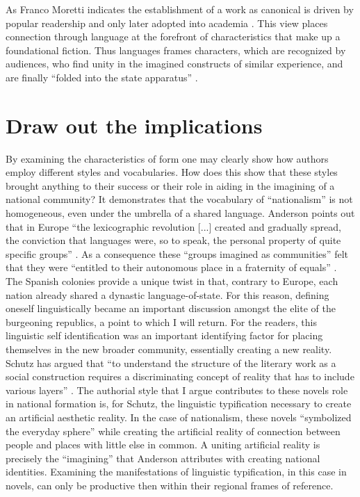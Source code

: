 \documentclass[12pt]{report}\usepackage[]{graphicx}\usepackage[]{color}
\begin{document}
\begin{spacing}{1.9}
As Franco Moretti indicates the establishment of a work as canonical is driven by popular readership and only later adopted into academia \autocite[]{Moretti2013}.
This view places connection through language at the forefront of characteristics that make up a foundational fiction. 
Thus languages frames characters, which are recognized by audiences, who find unity in the imagined constructs of similar experience, and are finally \enquote{folded into the state apparatus} \autocite[27]{Felski2008}.

\section{Draw out the implications}
By examining the characteristics of form one may clearly show how authors employ different styles and vocabularies.
How does this show that these styles brought anything to their success or their role in aiding in the imagining of a national community?
It demonstrates that the vocabulary of \enquote{nationalism} is not homogeneous, even under the umbrella of a shared language.
Anderson points out that in Europe \enquote{the lexicographic revolution [...] created and gradually spread, the conviction that languages were, so to speak, the personal property of quite specific groups} \autocite[84]{Anderson2006}.
As a consequence these \enquote{groups imagined as communities} felt that they were \enquote{entitled to their autonomous place in a fraternity of equals} \autocite[84]{Anderson2006}.
The Spanish colonies provide a unique twist in that, contrary to Europe, each nation already shared a dynastic language-of-state.
For this reason, defining oneself linguistically became an important discussion amongst the elite of the burgeoning republics, a point to which I will return.
For the readers, this linguistic self identification was an important identifying factor for placing themselves in the new broader community, essentially creating a new reality.
Schutz has argued that \enquote{to understand the structure of the literary work as a social construction requires a discriminating concept of reality that has to include various layers} \autocite[79]{Embree1998}.
The authorial style that I argue contributes to these novels role in national formation is, for Schutz, the linguistic typification necessary to create an artificial aesthetic reality.
In the case of nationalism, these novels \enquote{symbolized the everyday sphere} while creating the artificial reality of connection between people and places with little else in common.
A uniting artificial reality is precisely the \enquote{imagining} that Anderson attributes with creating national identities. 
Examining the manifestations of linguistic typification, in this case in novels, can only be productive then within their regional frames of reference.



\end{spacing}
\end{document}
